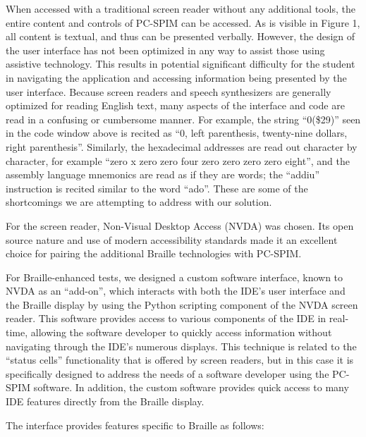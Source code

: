 \documentclass[11.5pt]{sig-alternate} %
\begin{document}
\begin{large}
When accessed with a traditional screen reader without any additional tools, the entire content and controls of PC-SPIM can be accessed. As is visible in Figure 1, all content is textual, and thus can be presented verbally. However, the design of the user interface has not been optimized in any way to assist those using assistive technology. This results in potential significant difficulty for the student in navigating the application and accessing information being presented by the user interface. Because screen readers and speech synthesizers are generally optimized for reading English text, many aspects of the interface and code are read in a confusing or cumbersome manner. For example, the string “0(\$29)” seen in the code window above is recited as “0, left parenthesis, twenty-nine dollars, right parenthesis”. Similarly, the hexadecimal addresses are read out character by character, for example “zero x zero zero four zero zero zero zero eight”, and the assembly language mnemonics are read as if they are words; the “addiu” instruction is recited similar to the word “ado”. These are some of the shortcomings we are attempting to address with our solution.

For the screen reader, Non-Visual Desktop Access (NVDA) was chosen. Its open source nature and use of modern accessibility standards made it an excellent choice for pairing the additional Braille technologies with PC-SPIM. 

For Braille-enhanced tests, we designed a custom software interface, known to NVDA as an “add-on”, which interacts with both the IDE’s user interface and the Braille display by using the Python scripting component of the NVDA screen reader. This software provides access to various components of the IDE in real-time, allowing the software developer to quickly access information without navigating through the IDE’s numerous displays. This technique is related to the “status cells” functionality that is offered by screen readers, but in this case it is specifically designed to address the needs of a software developer using the PC-SPIM software. In addition, the custom software provides quick access to many IDE features directly from the Braille display. 

The interface provides features specific to Braille as follows:


\end{large}
\end{document}
